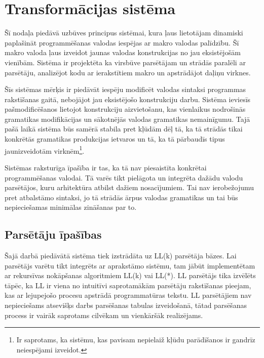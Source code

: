 \section{Transformācijas sistēma}
\label{s:system}

Šī nodaļa piedāvā uzbūves principus sistēmai, kura ļaus lietotājam dinamiski paplašināt programmēšanas valodas iespējas ar makro valodas palīdzību. Šī makro valoda ļaus izveidot jaunas valodas konstrukcijas no jau eksistējošām vienībām. Sistēma ir projektēta ka virsbūve parsētājam un strādās paralēli ar parsētāju, analizējot kodu ar ierakstītiem makro un apstrādājot daļiņu virknes.

Šīs sistēmas mērķis ir piedāvāt iespēju modificēt valodas sintaksi programmas rakstīšanas gaitā, nebojājot jau eksistējošo konstrukciju darbu. Sistēma ieviesīs pašmodificēšanos lietojot konstrukciju aizvietošanu, kas vienlaikus nodrošinās gramatikas modifikācijas un sākotnējās valodas gramatikas nemainīgumu. Tajā pašā laikā sistēma būs samērā stabila pret kļūdām dēļ tā, ka tā strādās tikai konkrētās gramatikas produkcijas ietvaros un tā, ka tā pārbaudīs tipus jaunizveidotām virknēm\footnote{Ir saprotams, ka sistēmu, kas pavisam nepielaiž kļūdu parādīšanos ir gandrīz neiespējami izveidot.}.

Sistēmas raksturīga īpašība ir tas, ka tā nav piesaistīta konkrētai programmēšanas valodai. Tā varēs tikt pielāgota un integrēta dažādu valodu parsētājos, kuru arhitektūra atbilst dažiem nosacījumiem. Tai nav ierobežojumu pret atbalstāmo sintaksi, jo tā strādās ārpus valodas gramatikas un tai būs nepieciešamas minimālas zināšanas par to.


\subsection{\label{sbs:sys_parserqualities}Parsētāju īpašības}

Šajā darbā piedāvātā sistēma tiek izstrādāta uz LL(k) parsētāja bāzes. Lai parsētājs varētu tikt integrēts ar aprakstāmo sistēmu, tam jābūt implementētam ar rekursīvas nokāpšanas algoritmiem LL(k) vai LL(*). LL parsētājs tika izvēlēts tāpēc, ka LL ir viena no intuitīvi saprotamākām parsētāju rakstīšanas pieejam, kas ar lejupejošo procesu apstrādā programmatūras tekstu. LL parsētājiem nav nepieciešams atsevišķs darbs parsēšanas tabulas izveidošanā, tātad parsēšanas process ir vairāk saprotams cilvēkam un vienkāršāk realizējams.

